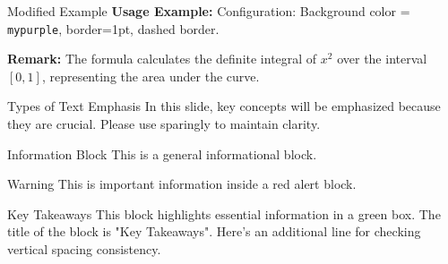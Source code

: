 
\begin{frame}{Modified Example}
  \textbf{Usage Example:} Configuration: Background color = \texttt{mypurple}, border=1pt, dashed border.
  \vspace{1em}


  \begin{center}
  \end{center}

  \vspace{1em}

  \textbf{Remark:} The formula calculates the definite integral of \(x^2\) over the interval \([0,1]\), representing the area under the curve.
\end{frame}

\begin{frame}{Types of Text Emphasis}
In this slide, key concepts will be \alert{emphasized} because they are crucial.  
Please use sparingly to maintain clarity.

\vspace{0.5em}
\begin{block}{Information Block}
This is a general informational block.
\end{block}

\vspace{0.5em}
\begin{alertblock}{Warning}
This is important information inside a red alert block.
\end{alertblock}

\vspace{0.5em}
\begin{exampleblock}{Key Takeaways}
This block highlights essential information in a green box.  
The title of the block is "Key Takeaways".  
Here's an additional line for checking vertical spacing consistency.
\end{exampleblock}

\end{frame}

